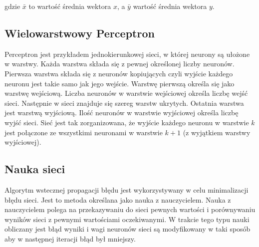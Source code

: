 \documentclass{classrep}
\begin{document}
gdzie $\bar{x}$  to wartość średnia wektora $x$, a $\bar{y}$ wartość średnia wektora $y$.

\subsection{Wielowarstwowy Perceptron}	
Perceptron jest przykładem jednokierunkowej sieci, w której neurony są ułożone w warstwy.
Każda warstwa składa się z pewnej określonej liczby neuronów. Pierwsza warstwa składa się z neuronów kopiujących czyli wyjście każdego neuronu jest takie samo jak jego wejście. Warstwę pierwszą określa się jako warstwę wejściową. Liczba neuronów w warstwie wejściowej	
określa liczbę wejść sieci. Następnie w sieci znajduje się szereg warstw	
ukrytych. Ostatnia warstwa jest warstwą wyjściową. Ilość neuronów w	
warstwie wyjściowej określa liczbę wyjść sieci. Sieć jest tak zorganizowana, że	
wyjście każdego neuronu w warstwie $k$ jest połączone ze wszystkimi neuronami w
warstwie $k+1$ (z wyjątkiem warstwy wyjściowej).			
\subsection{Nauka sieci}
Algorytm wstecznej propagacji błędu jest wykorzystywany w celu minimalizacji błędu sieci.
Jest to metoda określana jako nauka z nauczycielem. Nauka z nauczycielem polega na przekazywaniu do sieci pewnych wartości i porównywaniu wyników sieci z pewnymi wartościami oczekiwanymi. W trakcie tego typu nauki obliczany jest błąd wyniki i wagi neuronów sieci są modyfikowany w taki sposób aby w następnej iteracji błąd był mniejszy.
\end{document}
